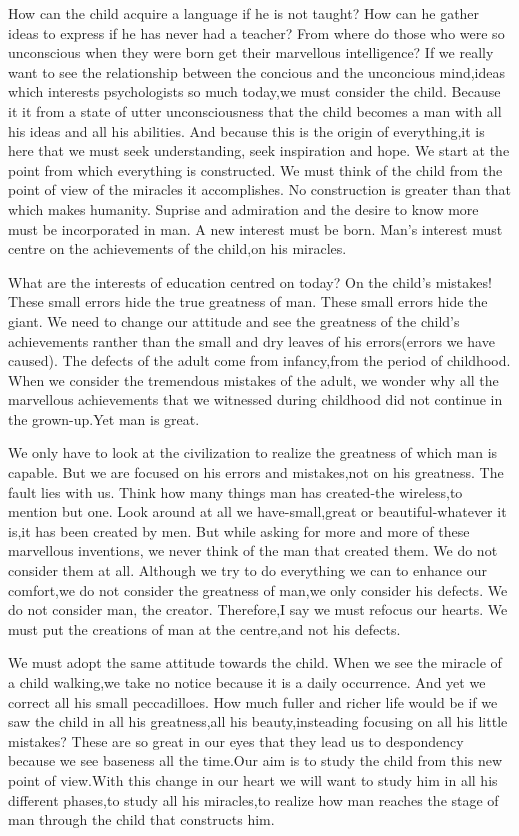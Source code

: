 \documentclass[lang=cn,10pt]{elegantbook}
\begin{document}
How can the child acquire a language if he is not taught? How can he gather ideas to express if he has never had a teacher? From where do those who were so unconscious when they were born get their marvellous intelligence? If we really want to see the relationship between the concious and the unconcious mind,ideas which interests psychologists so much today,we must consider the child. Because it it from a state of utter unconsciousness that the child becomes a man with all his ideas and all his abilities. And because this is the origin of everything,it is here that we must seek understanding, seek inspiration and hope. We start at the point from which everything is constructed. We must think of the child from the point of view of the miracles it accomplishes. No construction is greater than that which makes humanity. Suprise and admiration and the desire to know more must be incorporated in man. A new interest must be born. Man's interest must centre on the achievements of the child,on his miracles.

What are the interests of education centred on today? On the child's mistakes! These small errors hide the true greatness of man. These small errors hide the giant. We need to change our attitude and see the greatness of the child's achievements ranther than the small and dry leaves of his errors(errors we have caused). The defects of the adult come from infancy,from the period of childhood. When we consider the tremendous mistakes of the adult, we wonder why all the marvellous achievements that we witnessed during childhood did not continue in the grown-up.Yet man is great.

We only have to look at the civilization to realize the greatness of which man is capable. But we are focused on his errors and mistakes,not on his greatness. The fault lies with us. Think how many things man has created-the wireless,to mention but one. Look around at all we have-small,great or beautiful-whatever it is,it has been created by men. But while asking for more and more of these marvellous inventions, we never think of the man that created them. We do not consider them at all. Although we try to do everything we can to enhance our comfort,we do not consider the greatness of man,we only consider his defects. We do not consider man, the creator. Therefore,I say we must refocus our hearts. We must put the creations of man at the centre,and not his defects.

We must adopt the same attitude towards the child. When we see the miracle of a child walking,we take no notice because it is a daily occurrence. And yet we correct all his small peccadilloes. How much fuller and richer life would be if we saw the child in all his greatness,all his beauty,insteading focusing on all his little mistakes? These are so great in our eyes that they lead us to despondency because we see baseness all the time.Our aim is to study the child from this new point of view.With this change in our heart we will want to study him in all his different phases,to study all his miracles,to realize how man reaches the stage of man through the child that constructs him.
\end{document}
